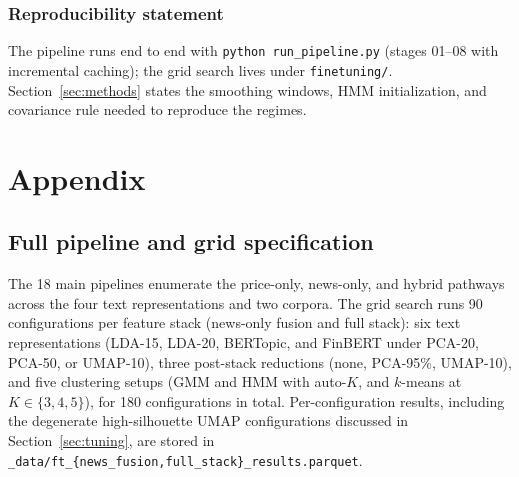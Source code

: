 \documentclass{article} %
\begin{document}
\subsubsection*{Reproducibility statement}
The pipeline runs end to end with \texttt{python run\_pipeline.py} (stages
01--08 with incremental caching); the grid search lives under
\texttt{finetuning/}. Section~\ref{sec:methods} states the smoothing windows,
HMM initialization, and covariance rule needed to reproduce the regimes.




\appendix
\section{Appendix}

\subsection{Full pipeline and grid specification}
The 18 main pipelines enumerate the price-only, news-only, and hybrid pathways
across the four text representations and two corpora. The grid search runs 90
configurations per feature stack (news-only fusion and full stack): six text
representations (LDA-15, LDA-20, BERTopic, and FinBERT under PCA-20, PCA-50, or
UMAP-10), three post-stack reductions (none, PCA-95\%, UMAP-10), and five
clustering setups (GMM and HMM with auto-$K$, and $k$-means at $K\in\{3,4,5\}$),
for 180 configurations in total. Per-configuration results, including the
degenerate high-silhouette UMAP configurations discussed in
Section~\ref{sec:tuning}, are stored in
\texttt{\_data/ft\_\{news\_fusion,full\_stack\}\_results.parquet}.
\end{document}
